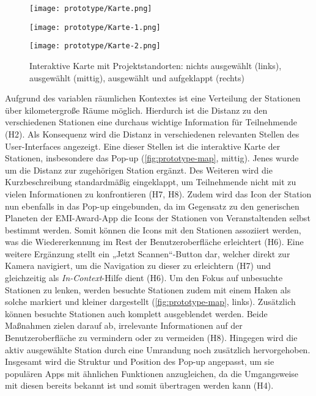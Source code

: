%

\begin{figure}[htpb]
    \begin{minipage}{.33\textwidth}
        \centering
        \texttt{[image: prototype/Karte.png]}
    \end{minipage}%
    \begin{minipage}{.33\textwidth}
        \centering
        \texttt{[image: prototype/Karte-1.png]}
    \end{minipage}
    \begin{minipage}{.33\textwidth}
        \centering
        \texttt{[image: prototype/Karte-2.png]}
    \end{minipage}
    \caption{Interaktive Karte mit Projektstandorten: nichts ausgewählt (links), ausgewählt (mittig), ausgewählt und aufgeklappt (rechts)}
    \label{fig:prototype-map}
\end{figure}

Aufgrund des variablen räumlichen Kontextes ist eine Verteilung der Stationen
über kilometergroße Räume möglich. Hierdurch ist die Distanz zu den
verschiedenen Stationen eine durchaus wichtige Information für Teilnehmende
(H2). Als Konsequenz wird die Distanz in verschiedenen relevanten Stellen des
User-Interfaces angezeigt. Eine dieser Stellen ist die interaktive Karte der
Stationen, insbesondere das Pop-up (\autoref{fig:prototype-map}, mittig). Jenes
wurde um die Distanz zur zugehörigen Station ergänzt. Des Weiteren wird die
Kurzbeschreibung standardmäßig eingeklappt, um Teilnehmende nicht mit zu vielen
Informationen zu konfrontieren (H7, H8). Zudem wird das Icon der Station nun
ebenfalls in das Pop-up eingebunden, da im Gegensatz zu den generischen Planeten
der EMI-Award-App die Icons der Stationen von Veranstaltenden selbst bestimmt
werden. Somit können die Icons mit den Stationen assoziiert werden, was die
Wiedererkennung im Rest der Benutzeroberfläche erleichtert (H6). Eine weitere
Ergänzung stellt ein „Jetzt Scannen“-Button dar, welcher direkt zur Kamera
navigiert, um die Navigation zu dieser zu erleichtern (H7) und gleichzeitig als
\textit{In-Context}-Hilfe dient (H6). Um den Fokus auf unbesuchte Stationen zu
lenken, werden besuchte Stationen zudem mit einem Haken als solche markiert und
kleiner dargestellt (\autoref{fig:prototype-map}, links). Zusätzlich können
besuchte Stationen auch komplett ausgeblendet werden. Beide Maßnahmen zielen
darauf ab, irrelevante Informationen auf der Benutzeroberfläche zu vermindern
oder zu vermeiden (H8). Hingegen wird die aktiv ausgewählte Station durch eine
Umrandung noch zusätzlich hervorgehoben. Insgesamt wird die Struktur und
Position des Pop-up angepasst, um sie populären Apps mit ähnlichen Funktionen
anzugleichen, da die Umgangsweise mit diesen bereits bekannt ist und somit
übertragen werden kann (H4).

